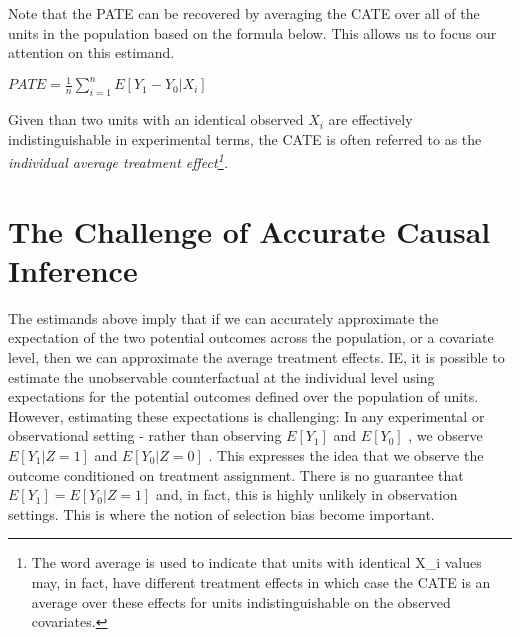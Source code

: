 \documentclass[../main.tex]{subfiles}
\begin{document}
\vspace{\baselineskip}
Note that the PATE can be recovered by averaging the CATE over all of the units in the population based on the formula below. This allows us to focus our attention on this estimand.\par


\vspace{\baselineskip}
\begin{adjustwidth}{0.5in}{0.0in}
 \( PATE = \frac{1}{n} \sum _{i=1}^{n}E \left[ Y_{1} - Y_{0}  \vert  X_{i} \right]  \) \par

\end{adjustwidth}


\vspace{\baselineskip}
Given than two units with an identical observed  \( X_{i} \) are effectively indistinguishable in experimental terms, the CATE is often referred to as the \textit{individual average treatment effect\footnote{ The word average is used to indicate that units with identical X\_i values may, in fact, have different treatment effects in which case the CATE is an average over these effects for units indistinguishable on the observed covariates. }.}\par

\section{The Challenge of Accurate Causal Inference}
\label{sec:challenge-of-causal-inference}

\vspace{\baselineskip}
The estimands above imply that if we can accurately approximate the expectation of the two potential outcomes across the population, or a covariate level, then we can approximate the average treatment effects. IE, it is possible to estimate the unobservable counterfactual at the individual level using expectations for the potential outcomes defined over the population of units. However, estimating these expectations is challenging: In any experimental or observational setting - rather than observing  \( E \left[ Y_{1} \right]  \)  and  \( E \left[ Y_{0} \right]  \) , we observe  \( E \left[ Y_{1}  \vert  Z=1 \right]   \) and  \( E \left[ Y_{0}  \vert  Z= 0 \right]  \) . This expresses the idea that we observe the outcome conditioned on treatment assignment. There is no guarantee that  \( E \left[ Y_{1} \right]  = E \left[ Y_{0}  \vert  Z=1 \right]  \)  and, in fact, this is highly unlikely in observation settings. This is where the notion of selection bias become important.\par
\end{document}
